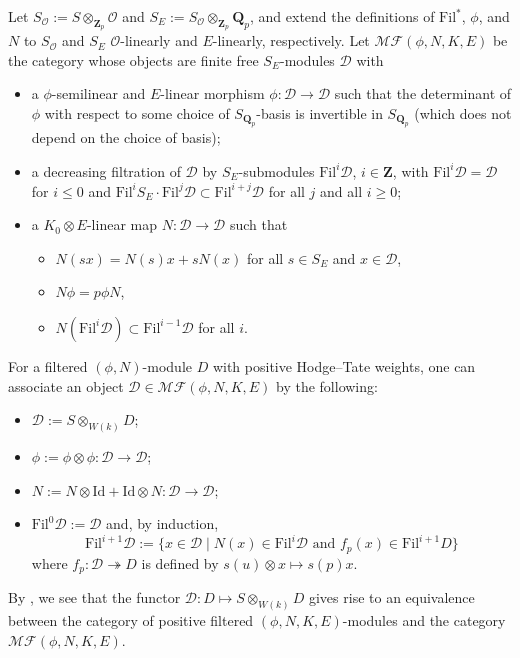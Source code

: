 \documentclass[11pt]{amsart}
\theoremstyle{definition}
\numberwithin{equation}{subsection}
\theoremstyle{plain}
\theoremstyle{plain}
\theoremstyle{plain}
\theoremstyle{plain}
\theoremstyle{plain}
\theoremstyle{plain}
\theoremstyle{plain}
\theoremstyle{plain}
\theoremstyle{plain}
\theoremstyle{plain}
\theoremstyle{plain}
\theoremstyle{plain}
\theoremstyle{definition}
\theoremstyle{definition}
\theoremstyle{definition}
\theoremstyle{remark}
\renewcommand{\(}{\textup{(}}
\renewcommand{\)}{\textup{)}}
\newcommand{\Q}{\mathbf{Q}}
\newcommand{\Z}{\mathbf{Z}}
\newcommand{\Fil}{\mathrm{Fil}}
\newcommand{\cD}{\mathcal{D}}
\newcommand{\cO}{\mathcal{O}}
\begin{document}
Let $S_{\cO}:=S\otimes_{\Z_p}\cO$ and $S_{E}:=S_{\cO}\otimes_{\Z_p}\Q_p$, and extend the definitions of $\Fil^*$, $\phi$, and $N$ to $S_{\cO}$ and $S_{E}$ $\cO$-linearly and $E$-linearly, respectively. Let $\mathcal{MF}(\phi,N,K,E)$ be the category whose objects are finite free $S_{E}$-modules $\cD$ with
\begin{itemize}[leftmargin=*]
\item a $\phi$-semilinear and $E$-linear morphism $\phi:\cD\rightarrow\cD$ such that the determinant of $\phi$ with respect to some choice of $S_{\Q_p}$-basis is invertible in $S_{\Q_p}$ (which does not depend on the choice of basis);
\item a decreasing filtration of $\cD$ by $S_{E}$-submodules $\Fil^{i}\cD$, $i\in\Z$, with $\Fil^{i}\cD=\cD$ for $i\leq 0$ and $\Fil^{i}S_{E}\cdot\Fil^{j}\cD\subset\Fil^{i+j}\cD
    $ for all $j$ and all $i\geq 0$;
\item a $K_{0}\otimes E$-linear map $N:\cD
\rightarrow \cD
$ such that
    \begin{itemize}[leftmargin=*]
    \item $N(sx)=N(s)x+sN(x)$ for all $s\in S_{E}$ and $x\in\cD$,
    \item $N\phi=p\phi N$,
    \item $N(\Fil^{i}\cD)\subset\Fil^{i-1}\cD$ for all $i$.
    \end{itemize}
\end{itemize}



For a filtered $(\phi,N)$-module $D$ with positive Hodge--Tate weights, one can associate an object $\cD\in\mathcal{MF}(\phi,N,K,E)$ by the following:
\begin{itemize}[leftmargin=*]
\item $\cD:=S\otimes_{W(k)}D$;
\item $\phi:=\phi\otimes\phi:\cD\rightarrow\cD$;
\item $N:=N\otimes\mathrm{Id}+\mathrm{Id}\otimes N:\cD\rightarrow\cD$;
\item $\Fil^{0}\cD:=\cD$ and, by induction, $$\Fil^{i+1}\cD:=\{x\in\cD\mid N(x)\in\Fil^{i}\cD\mbox{ and }f_{p}(x)\in\Fil^{i+1}D\}$$ where $f_{p}:\cD\twoheadrightarrow D$ is defined by $s(u)\otimes x\mapsto s(p)x$.
\end{itemize}
By \cite{Bre97}, we see that the functor $\cD:D\mapsto S\otimes_{W(k)}D$ gives rise to an equivalence between the category of positive filtered $(\phi,N,K,E)$-modules and the category $\mathcal{MF}(\phi,N,K,E)$.
\end{document}
